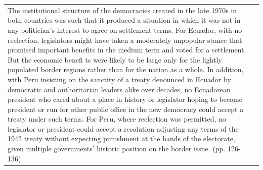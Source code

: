{\begin{longtable}{p{}p{}}
The institutional structure of the democracies created in the late 1970s in both countries was such that it produced a situation in which it was not in any politician's interest to agree on settlement terms. For Ecuador, with no reelection, legislators might have taken a moderately unpopular stance that promised important benefits in the medium term and voted for a settlement. But the economic benefi ts were likely to be large only for the lightly populated border regions rather than for the nation as a whole. In addition, with Peru insisting on the sanctity of a treaty denounced in Ecuador by democratic and authoritarian leaders alike over decades, no Ecuadorean president who cared about a place in history or legislator hoping to become president or run for other public office in the new democracy could accept a treaty under such terms. For Peru, where reelection was permitted, no legislator or president could accept a resolution adjusting any terms of the 1942 treaty without expecting punishment at the hands of the electorate, given multiple governments' historic position on the border issue. (pp. 126-136)


\end{longtable}}
